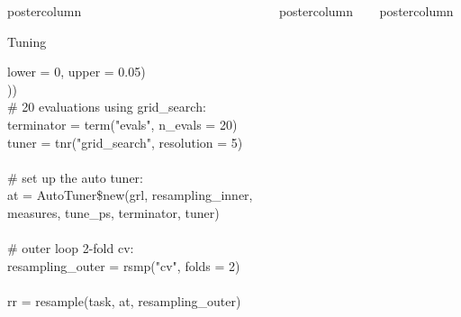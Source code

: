 \documentclass{beamer}
\newlength{\columnheight} %
\begin{document}
\begin{frame}[fragile]{}
\begin{columns}
\begin{column}{.245\textwidth}
\begin{beamercolorbox}[center]{postercolumn}
\begin{minipage}{.98\textwidth}
{\begin{myblock}{Tuning}
\begin{codeboxexample}
{                \hspace*{2ex} lower = 0, upper = 0.05)\\
                ))\\
                \# 20 evaluations using grid\_search:\\
                terminator = term("evals", n\_evals = 20)\\
                tuner = tnr("grid\_search", resolution = 5)\\
                \ \\
                \# set up the auto tuner:\\
                at = AutoTuner\$new(grl, resampling\_inner,\\
                \hspace*{1ex} measures, tune\_ps, terminator, tuner)\\
                \ \\
                \# outer loop 2-fold cv:\\
                resampling\_outer = rsmp("cv", folds = 2)\\
                \ \\
                rr = resample(task, at, resampling\_outer)}
					    \end{codeboxexample}
            \end{myblock}
						\vfill}
        \end{minipage}
			\end{beamercolorbox}
		\end{column}
    \begin{column}{.245\textwidth}
			\begin{beamercolorbox}[center]{postercolumn}
				\begin{minipage}{.98\textwidth}
					\parbox[t][\columnheight]{\textwidth}{
            \begin{myblock}{}
            \end{myblock}
						\vfill}
        \end{minipage}
			\end{beamercolorbox}
		\end{column}
    \begin{column}{.245\textwidth}
			\begin{beamercolorbox}[center]{postercolumn}
				\begin{minipage}{.98\textwidth}
					\parbox[t][\columnheight]{\textwidth}{
            \begin{myblock}{}
            \end{myblock}
						\vfill}
        \end{minipage}
			\end{beamercolorbox}
		\end{column}
	\end{columns}
\end{frame}
\end{document}
